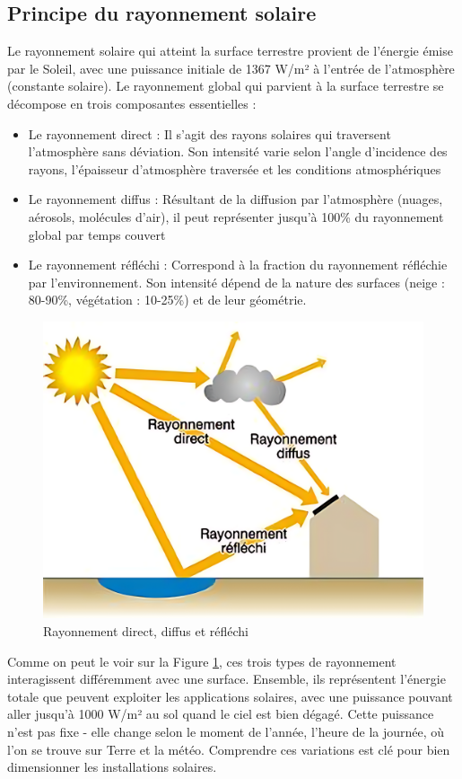 \subsection{Principe du rayonnement solaire}
Le rayonnement solaire \cite{energie_plus_ensoleillement_2010} qui atteint la surface terrestre provient de l'énergie émise par le Soleil, avec une puissance initiale de 1367 W/m² à l'entrée de l'atmosphère (constante solaire). Le rayonnement global qui parvient à la surface terrestre se décompose en trois composantes essentielles :
\begin{itemize}
    \item Le rayonnement direct : Il s'agit des rayons solaires qui traversent l'atmosphère sans déviation. Son intensité varie selon l'angle d'incidence des rayons, l'épaisseur d'atmosphère traversée et les conditions atmosphériques
    
    \item Le rayonnement diffus : Résultant de la diffusion par l'atmosphère (nuages, aérosols, molécules d'air), il peut représenter jusqu'à 100\% du rayonnement global par temps couvert

    \item Le rayonnement réfléchi : Correspond à la fraction du rayonnement réfléchie par l'environnement. Son intensité dépend de la nature des surfaces (neige : 80-90\%, végétation : 10-25\%) et de leur géométrie. 
\end{itemize}

\begin{figure}[H]
    \centering
    \includegraphics[width=0.5\linewidth]{03-tail//A2_fondamentaux_energie/A2_figures/A2_rayonnement.png}
    \caption{Rayonnement direct, diffus et réfléchi \cite{energie_plus_ensoleillement_2010}}
    \label{fig:type_rayonnement}
\end{figure}

\par{Comme on peut le voir sur la Figure \ref{fig:type_rayonnement}, ces trois types de rayonnement interagissent différemment avec une surface. Ensemble, ils représentent l'énergie totale que peuvent exploiter les applications solaires, avec une puissance pouvant aller jusqu'à 1000 W/m² au sol quand le ciel est bien dégagé. Cette puissance n'est pas fixe - elle change selon le moment de l'année, l'heure de la journée, où l'on se trouve sur Terre et la météo. Comprendre ces variations est clé pour bien dimensionner les installations solaires.}

